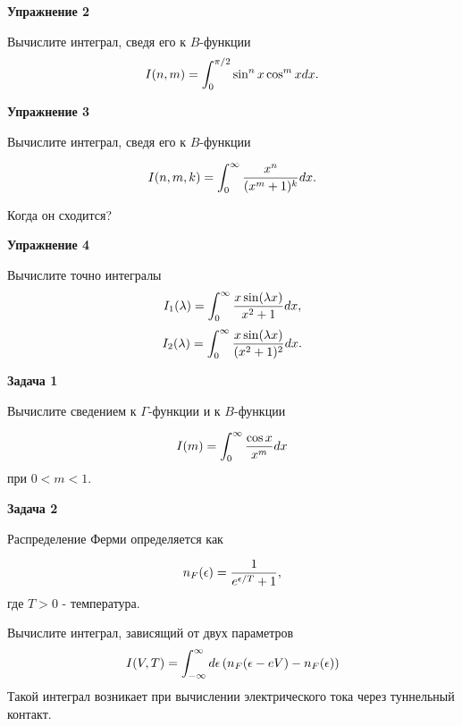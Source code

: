 \documentclass[a4paper,12pt]{article}
\begin{document}
\vspace{15pt}
\noindent \textbf{Упражнение 2}

\noindent Вычислите интеграл, сведя его к $B$-функции
\begin{equation}
I(n,m)=\int_{0}^{\pi/2}\sin^{n}x\cos^{m}xdx.\notag
\end{equation}

\vspace{15pt}
\noindent \textbf{Упражнение 3}

\noindent Вычислите интеграл, сведя его к $B$-функции

\begin{equation}
I(n,m,k)	=\int_{0}^{\infty}\frac{x^{n}}{(x^{m}+1)^{k}}dx.\notag
\end{equation}

\noindent Когда он сходится?

\vspace{15pt}
\noindent \textbf{Упражнение 4}

\noindent Вычислите точно интегралы
\begin{equation}
I_{1}(\lambda)	=\int_{0}^{\infty}\frac{x\sin(\lambda x)}{x^{2}+1}dx,\notag
\end{equation}
\vspace{15pt}
\begin{equation}
I_{2}(\lambda)	=\int_{0}^{\infty}\frac{x\sin(\lambda x)}{(x^{2}+1)^{2}}dx.\notag
\end{equation}

\vspace{15pt}
\noindent \textbf{Задача 1}

\noindent Вычислите сведением к $\Gamma$-функции и к $B$-функции

\begin{equation}
I(m)	=\int_{0}^{\infty}\frac{\cos x}{x^{m}}dx \notag
\end{equation}
при $0<m<1$.

\vspace{15pt}
\noindent \textbf{Задача 2}

\noindent Распределение Ферми определяется как

\begin{equation}
n_{F}(\epsilon)	=\frac{1}{e^{\epsilon/T}+1},\notag
\end{equation}
где $T>0$ - температура.

\noindent Вычислите интеграл, зависящий от двух параметров
\begin{equation}
I(V,T)	=\int_{-\infty}^{\infty}d\epsilon\left(n_{F}(\epsilon-eV)-n_{F}(\epsilon)\right)\notag
\end{equation}
\noindent Такой интеграл возникает при вычислении электрического тока через туннельный контакт.
\end{document}
